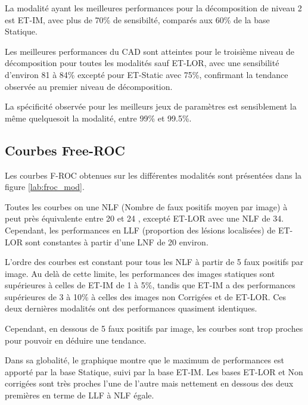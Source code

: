 La modalité ayant les meilleures performances pour la décomposition de niveau 2 est ET-IM, avec plus de 70\% de sensibilté, comparés aux 60\% de la base Statique. 

Les meilleures performances du CAD sont atteintes pour le troisième niveau de décomposition pour toutes les modalités sauf ET-LOR, avec une sensibilité d'environ 81 à 84\% excepté pour ET-Static avec 75\%, confirmant la tendance observée au premier niveau de décomposition.

La spécificité observée pour les meilleurs jeux de paramètres est sensiblement la même quelquesoit la modalité, entre 99\% et 99.5\%.

\subsection{Courbes Free-ROC}

Les courbes F-ROC obtenues sur les différentes modalités sont présentées dans la figure \ref{lab:froc_mod}. 

Toutes les courbes on une NLF (Nombre de faux positifs moyen par image) à peut près équivalente entre 20 et 24 , excepté ET-LOR avec une NLF de 34. Cependant, les performances en LLF (proportion des lésions localisées) de ET-LOR sont constantes à partir d'une LNF de 20 environ. 

L'ordre des courbes est constant pour tous les NLF à partir de 5 faux positifs par image. Au delà de cette limite, les performances des images statiques sont supérieures à celles de ET-IM de 1 à 5\%, tandis que ET-IM a des performances supérieures de 3 à 10\% à celles des images non Corrigées et de ET-LOR. Ces deux dernières modalités ont des performances quasiment identiques.

Cependant, en dessous de 5 faux positifs par image, les courbes sont trop proches pour pouvoir en déduire une tendance.


Dans sa globalité, le graphique montre que le maximum de performances est apporté par la base Statique, suivi par la base ET-IM. Les bases ET-LOR et Non corrigées sont très proches l'une de l'autre mais nettement en dessous des deux premières en terme de LLF à NLF égale.

